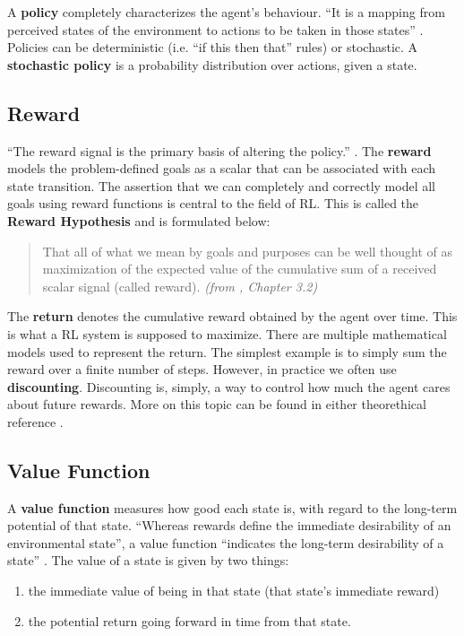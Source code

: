 A \textbf{policy} completely characterizes the agent’s behaviour.
``It is a mapping from perceived states of the environment to actions to be taken in those states'' \cite{rlai}.
Policies can be deterministic (i.e. ``if this then that'' rules) or stochastic.
A \textbf{stochastic policy}\cite{silver-lectures} is a probability distribution over actions, given a state.

\subsection{Reward}
``The reward signal is the primary basis of altering the policy.'' \cite{rlai}.
The \textbf{reward} models the problem-defined goals as a scalar that can be associated with each state transition.
The assertion that we can completely and correctly model all goals using reward functions is central to the field of RL.
This is called the \textbf{Reward Hypothesis} and is formulated below:
\begin{quotation}
    That all of what we mean by goals and purposes can be well thought of as maximization of the expected value of the cumulative sum of a received scalar signal (called reward). \textit{(from \cite{rlai}, Chapter 3.2)}
\end{quotation}

The \textbf{return} denotes the cumulative reward obtained by the agent over time.
This is what a RL system is supposed to maximize.
There are multiple mathematical models used to represent the return.
The simplest example is to simply sum the reward over a finite number of steps.
However, in practice we often use \textbf{discounting}.
Discounting is, simply, a way to control how much the agent cares about future rewards.
More on this topic can be found in either theorethical reference \cite{rlai,silver-lectures}.

\subsection{Value Function}\label{rl:value-func}

A \textbf{value function} measures how good each state is, with regard to the long-term potential of that state.
``Whereas rewards define the immediate desirability of an environmental state'', a value function ``indicates the long-term desirability of a state'' \cite{rlai}.
The value of a state is given by two things:
\begin{enumerate}
    \item the immediate value of being in that state (that state’s immediate reward)
    \item the potential return going forward in time from that state.
\end{enumerate}

